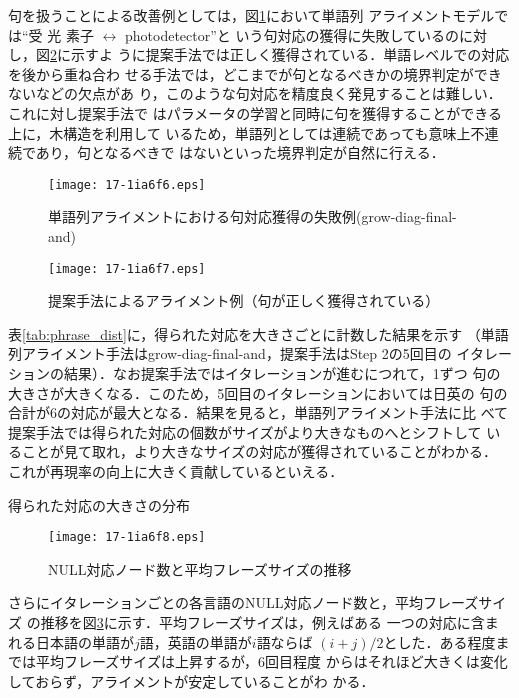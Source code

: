 \documentclass[japanese]{jnlp_1.4}
\begin{document}
句を扱うことによる改善例としては，図\ref{fig:result_fail}において単語列
アライメントモデルでは“受 光 素子 $\leftrightarrow$ photodetector”と
いう句対応の獲得に失敗しているのに対し，図\ref{fig:result_good2}に示すよ
うに提案手法では正しく獲得されている．単語レベルでの対応を後から重ね合わ
せる手法では，どこまでが句となるべきかの境界判定ができないなどの欠点があ
り，このような句対応を精度良く発見することは難しい．これに対し提案手法で
はパラメータの学習と同時に句を獲得することができる上に，木構造を利用して
いるため，単語列としては連続であっても意味上不連続であり，句となるべきで
はないといった境界判定が自然に行える．

\begin{figure}[b]
 \begin{center}
  \texttt{[image: 17-1ia6f6.eps]}
 \end{center}
  \caption{単語列アライメントにおける句対応獲得の失敗例(grow-diag-final-and)}
  \label{fig:result_fail}
\end{figure}
\begin{figure}[b]
 \begin{center}
  \texttt{[image: 17-1ia6f7.eps]}
 \end{center}
  \caption{提案手法によるアライメント例（句が正しく獲得されている）}
  \label{fig:result_good2}
\end{figure}

表\ref{tab:phrase_dist}に，得られた対応を大きさごとに計数した結果を示す
（単語列アライメント手法はgrow-diag-final-and，提案手法はStep 2の5回目の
イタレーションの結果）．なお提案手法ではイタレーションが進むにつれて，1ずつ
句の大きさが大きくなる．このため，5回目のイタレーションにおいては日英の
句の合計が6の対応が最大となる．結果を見ると，単語列アライメント手法に比
べて提案手法では得られた対応の個数がサイズがより大きなものへとシフトして
いることが見て取れ，より大きなサイズの対応が獲得されていることがわかる．
これが再現率の向上に大きく貢献しているといえる．

\begin{table}[b]
  \caption{得られた対応の大きさの分布}
  \label{tab:phrase_dist}

\end{table}
\begin{figure}[b]
 \begin{center}
  \texttt{[image: 17-1ia6f8.eps]}
 \end{center}
  \caption{NULL対応ノード数と平均フレーズサイズの推移}
  \label{fig:phrase-size}
\end{figure}


さらにイタレーションごとの各言語のNULL対応ノード数と，平均フレーズサイズ
の推移を図\ref{fig:phrase-size}に示す．平均フレーズサイズは，例えばある
一つの対応に含まれる日本語の単語が$j$語，英語の単語が$i$語ならば
$(i+j)/2$とした．ある程度までは平均フレーズサイズは上昇するが，6回目程度
からはそれほど大きくは変化しておらず，アライメントが安定していることがわ
かる．
\end{document}
